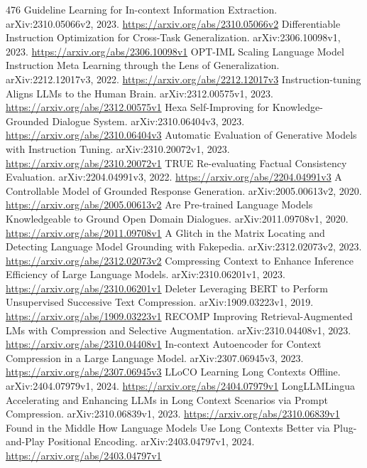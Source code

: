 \documentclass[11pt]{article}
\begin{document}
\begin{thebibliography}{476}
 Guideline Learning for In-context Information Extraction. arXiv:2310.05066v2, 2023. \url{https://arxiv.org/abs/2310.05066v2}
 Differentiable Instruction Optimization for Cross-Task Generalization. arXiv:2306.10098v1, 2023. \url{https://arxiv.org/abs/2306.10098v1}
 OPT-IML Scaling Language Model Instruction Meta Learning through the Lens of Generalization. arXiv:2212.12017v3, 2022. \url{https://arxiv.org/abs/2212.12017v3}
 Instruction-tuning Aligns LLMs to the Human Brain. arXiv:2312.00575v1, 2023. \url{https://arxiv.org/abs/2312.00575v1}
 Hexa Self-Improving for Knowledge-Grounded Dialogue System. arXiv:2310.06404v3, 2023. \url{https://arxiv.org/abs/2310.06404v3}
 Automatic Evaluation of Generative Models with Instruction Tuning. arXiv:2310.20072v1, 2023. \url{https://arxiv.org/abs/2310.20072v1}
 TRUE Re-evaluating Factual Consistency Evaluation. arXiv:2204.04991v3, 2022. \url{https://arxiv.org/abs/2204.04991v3}
 A Controllable Model of Grounded Response Generation. arXiv:2005.00613v2, 2020. \url{https://arxiv.org/abs/2005.00613v2}
 Are Pre-trained Language Models Knowledgeable to Ground Open Domain Dialogues. arXiv:2011.09708v1, 2020. \url{https://arxiv.org/abs/2011.09708v1}
 A Glitch in the Matrix Locating and Detecting Language Model Grounding with Fakepedia. arXiv:2312.02073v2, 2023. \url{https://arxiv.org/abs/2312.02073v2}
 Compressing Context to Enhance Inference Efficiency of Large Language Models. arXiv:2310.06201v1, 2023. \url{https://arxiv.org/abs/2310.06201v1}
 Deleter Leveraging BERT to Perform Unsupervised Successive Text Compression. arXiv:1909.03223v1, 2019. \url{https://arxiv.org/abs/1909.03223v1}
 RECOMP Improving Retrieval-Augmented LMs with Compression and Selective Augmentation. arXiv:2310.04408v1, 2023. \url{https://arxiv.org/abs/2310.04408v1}
 In-context Autoencoder for Context Compression in a Large Language Model. arXiv:2307.06945v3, 2023. \url{https://arxiv.org/abs/2307.06945v3}
 LLoCO Learning Long Contexts Offline. arXiv:2404.07979v1, 2024. \url{https://arxiv.org/abs/2404.07979v1}
 LongLLMLingua Accelerating and Enhancing LLMs in Long Context Scenarios via Prompt Compression. arXiv:2310.06839v1, 2023. \url{https://arxiv.org/abs/2310.06839v1}
 Found in the Middle How Language Models Use Long Contexts Better via Plug-and-Play Positional Encoding. arXiv:2403.04797v1, 2024. \url{https://arxiv.org/abs/2403.04797v1}

\end{thebibliography}
\end{document}
